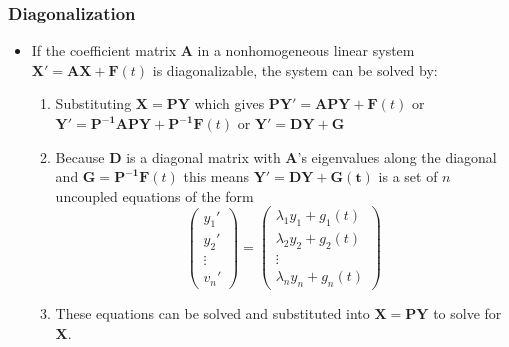 \documentclass{article}
\begin{document}
\subsubsection{Diagonalization}

\begin{itemize}
  \item If the coefficient matrix $\mathbf{A}$ in a nonhomogeneous linear system \\ $\mathbf{X' = A X + F}(t)$ is diagonalizable, the system can be solved by:

        \begin{enumerate}
          \item Substituting $\mathbf{X = P Y}$ which gives $\mathbf{P Y' = A P Y + F}(t)$ or \\ $\mathbf{Y' = P^{-1} A P Y + P^{-1} F}(t)$ or $\mathbf{Y' = D Y + G}$

          \item Because $\mathbf{D}$ is a diagonal matrix with $\mathbf{A}$'s eigenvalues along the diagonal and $\mathbf{G = P^{-1} F}(t)$ this means $\mathbf{Y' = D Y + G(t)}$ is a set of $n$ uncoupled equations of the form \[\begin{pmatrix}
                    y_1'   \\
                    y_2'   \\
                    \vdots \\
                    v_n'
                  \end{pmatrix} = \begin{pmatrix}
                    \lambda_1 y_1 + g_1(t) \\
                    \lambda_2 y_2 + g_2(t) \\
                    \vdots                 \\
                    \lambda_n y_n + g_n(t)
                  \end{pmatrix}\]

          \item These equations can be solved and substituted into $\mathbf{X = P Y}$ to solve for $\mathbf{X}$.
        \end{enumerate}
\end{itemize}
\end{document}

